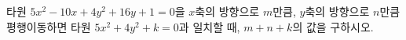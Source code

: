 타원 $5x^2-10x+4y^2+16y+1=0$을 $x$축의 방향으로 $m$만큼, $y$축의 방향으로 $n$만큼 평행이동하면 타원 $5x^2+4y^2+k=0$과 일치할 때, $m+n+k$의 값을 구하시오. 
